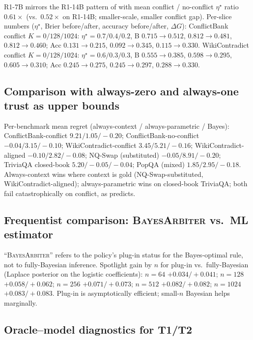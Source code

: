 R1-7B mirrors the R1-14B pattern of  with
mean conflict / no-conflict $\eta^\star$ ratio $0.61\!\times$
(vs.\ $0.52\!\times$ on R1-14B; smaller-scale, smaller conflict gap).
Per-slice numbers ($\eta^\star$, Brier before/after, accuracy
before/after, $\Delta G$): ConflictBank conflict $K\!=\!0/128/1024$:
$\eta^\star\!=\!0.7/0.4/0.2$, B $0.715\!\to\!0.512$, $0.812\!\to\!0.481$,
$0.812\!\to\!0.460$; Acc $0.131\!\to\!0.215$, $0.092\!\to\!0.345$,
$0.115\!\to\!0.330$.  WikiContradict conflict $K\!=\!0/128/1024$:
$\eta^\star\!=\!0.6/0.3/0.3$, B $0.555\!\to\!0.385$,
$0.598\!\to\!0.295$, $0.605\!\to\!0.310$; Acc $0.245\!\to\!0.275$,
$0.245\!\to\!0.297$, $0.288\!\to\!0.330$.


\subsection{Comparison with always-zero and always-one trust as upper bounds}
\label{app:trust-extremes}

Per-benchmark mean regret (always-context / always-parametric / Bayes):
ConflictBank-conflict $9.21/1.05/-0.20$;
ConflictBank-no-conflict $-0.04/3.15/-0.10$;
WikiContradict-conflict $3.45/5.21/-0.16$;
WikiContradict-aligned $-0.10/2.82/-0.08$;
NQ-Swap (substituted) $-0.05/8.91/-0.20$;
TriviaQA closed-book $5.20/-0.05/-0.04$;
PopQA (mixed) $1.85/2.95/-0.18$.
Always-context wins where context is gold (NQ-Swap-substituted,
WikiContradict-aligned); always-parametric wins on closed-book
TriviaQA; both fail catastrophically on conflict, as
 predicts.


\subsection{Frequentist comparison: \textsc{BayesArbiter} vs.\ ML estimator}
\label{app:frequentist}

``\textsc{BayesArbiter}'' refers to the policy's plug-in status for the
Bayes-optimal rule, not to fully-Bayesian inference.  Spotlight
gain by $n$ for plug-in vs.\ fully-Bayesian (Laplace posterior on
the logistic coefficients): $n\!=\!64$ $+0.034 / +0.041$;
$n\!=\!128$ $+0.058 / +0.062$; $n\!=\!256$ $+0.071 / +0.073$;
$n\!=\!512$ $+0.082 / +0.082$; $n\!=\!1024$ $+0.083 / +0.083$.
Plug-in is asymptotically efficient; small-$n$ Bayesian helps
marginally.


\subsection{Oracle--model diagnostics for T1/T2}
\label{app:oracle-diagnostics}

